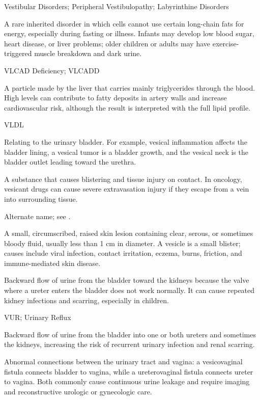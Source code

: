 \synonyms
Vestibular Disorders; Peripheral Vestibulopathy; Labyrinthine Disorders

 A rare inherited disorder in which cells cannot use certain long-chain fats for energy, especially during fasting or illness. Infants may develop low blood sugar, heart disease, or liver problems; older children or adults may have exercise-triggered muscle breakdown and dark urine.

\synonyms
VLCAD Deficiency; VLCADD

 A particle made by the liver that carries mainly triglycerides through the blood. High levels can contribute to fatty deposits in artery walls and increase cardiovascular risk, although the result is interpreted with the full lipid profile.

\synonyms
VLDL

 Relating to the urinary bladder. For example, vesical inflammation affects the bladder lining, a vesical tumor is a bladder growth, and the vesical neck is the bladder outlet leading toward the urethra.

 A substance that causes blistering and tissue injury on contact. In oncology, vesicant drugs can cause severe extravasation injury if they escape from a vein into surrounding tissue.

 Alternate name; see .

 A small, circumscribed, raised skin lesion containing clear, serous, or sometimes bloody fluid, usually less than 1 cm in diameter. A vesicle is a small blister; causes include viral infection, contact irritation, eczema, burns, friction, and immune-mediated skin disease.


 Backward flow of urine from the bladder toward the kidneys because the valve where a ureter enters the bladder does not work normally. It can cause repeated kidney infections and scarring, especially in children.

\synonyms
VUR; Urinary Reflux

 Backward flow of urine from the bladder into one or both ureters and sometimes the kidneys, increasing the risk of recurrent urinary infection and renal scarring.

 Abnormal connections between the urinary tract and vagina: a vesicovaginal fistula connects bladder to vagina, while a ureterovaginal fistula connects ureter to vagina. Both commonly cause continuous urine leakage and require imaging and reconstructive urologic or gynecologic care.

